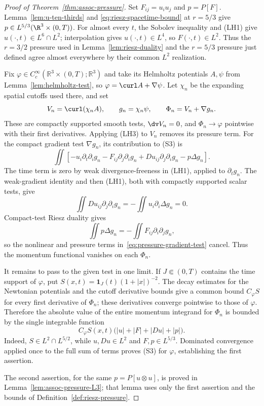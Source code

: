 \documentclass[11pt,reqno]{amsart}
\begin{document}
\begin{proof}[Proof of Theorem~\ref{thm:assoc-pressure}]
Set $F_{ij}=u_i u_j$ and $p=P[F]$. Lemma~\ref{lem:u-ten-thirds} and
\eqref{eq:riesz-spacetime-bound} at $r=5/3$ give
$p\in L^{5/3}(\R^3\times(0,T))$. For almost every $t$, the Sobolev
inequality and (LH1) give $u(\cdot,t)\in L^6\cap L^2$; interpolation gives
$u(\cdot,t)\in L^4$, so $F(\cdot,t)\in L^2$. Thus the $r=3/2$ pressure
used in Lemma~\ref{lem:riesz-duality} and the $r=5/3$ pressure just defined
agree almost everywhere by their common $L^2$ realization.

Fix $\varphi\in C_c^\infty(\mathbb R^3\times(0,T);\mathbb R^3)$ and take its Helmholtz potentials $A,\psi$ from Lemma~\ref{lem:helmholtz-test}, so $\varphi=\curl A+\nabla\psi$. Let $\chi_n$ be the expanding spatial cutoffs used there, and set
\[
 V_n=\curl(\chi_n A),\qquad g_n=\chi_n\psi,\qquad
 \Phi_n=V_n+\nabla g_n.
\]
These are compactly supported smooth tests, $\dv V_n=0$, and $\Phi_n\to\varphi$ pointwise with their first derivatives. Applying (LH3) to $V_n$ removes its pressure term. For the compact gradient test $\nabla g_n$, its contribution to (S3) is
\begin{equation}\label{eq:pressure-gradient-test}
\iint\left[-u_i\partial_t\partial_i g_n
-F_{ij}\partial_j\partial_i g_n
+Du_{ij}\partial_j\partial_i g_n
-p\Delta g_n\right].
\end{equation}
The time term is zero by weak divergence-freeness in (LH1), applied to $\partial_tg_n$. The weak-gradient identity and then (LH1), both with compactly supported scalar tests, give
\begin{equation}\label{eq:viscous-gradient-test}
\iint Du_{ij}\partial_j\partial_i g_n
=-\iint u_i\partial_i\Delta g_n=0.
\end{equation}
Compact-test Riesz duality gives
\begin{equation}\label{eq:pressure-gradient-cancellation}
\iint p\Delta g_n=-\iint F_{ij}\partial_i\partial_j g_n,
\end{equation}
so the nonlinear and pressure terms in~\eqref{eq:pressure-gradient-test} cancel. Thus the momentum functional vanishes on each $\Phi_n$.

It remains to pass to the given test in one limit. If $J\Subset(0,T)$ contains the time support of $\varphi$, put $S(x,t)=\mathbf1_J(t)(1+|x|)^{-2}$. The decay estimates for the Newtonian potentials and the cutoff derivative bounds give a common bound $C_\varphi S$ for every first derivative of $\Phi_n$; these derivatives converge pointwise to those of $\varphi$. Therefore the absolute value of the entire momentum integrand for $\Phi_n$ is bounded by the single integrable function
\[
 C_\varphi S(x,t)\bigl(|u|+|F|+|Du|+|p|\bigr).
\]
Indeed, $S\in L^2\cap L^{5/2}$, while $u,Du\in L^2$ and $F,p\in L^{5/3}$. Dominated convergence applied once to the full sum of terms proves (S3) for $\varphi$, establishing the first assertion.

The second assertion, for the same
$p=P[u\otimes u]$, is proved in Lemma~\ref{lem:assoc-pressure-L3}; that
lemma uses only the first assertion and the bounds of Definition~\ref{def:riesz-pressure}.
\end{proof}
\end{document}
